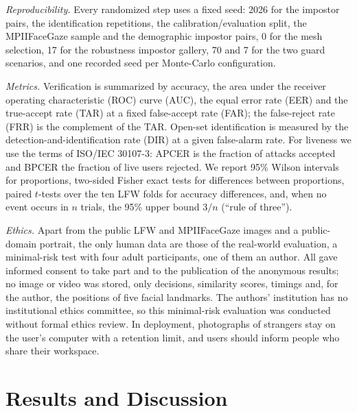\documentclass[journal]{IEEEtran}
\begin{document}
\emph{Reproducibility.} Every randomized step uses a fixed seed: 2026 for the impostor pairs, the identification repetitions, the calibration/evaluation split, the MPIIFaceGaze sample and the demographic impostor pairs, 0 for the mesh selection, 17 for the robustness impostor gallery, 70 and 7 for the two guard scenarios, and one recorded seed per Monte-Carlo configuration.

\emph{Metrics.} Verification is summarized by accuracy, the area under the receiver operating characteristic (ROC) curve (AUC), the equal error rate (EER) and the true-accept rate (TAR) at a fixed false-accept rate (FAR); the false-reject rate (FRR) is the complement of the TAR. Open-set identification is measured by the detection-and-identification rate (DIR) at a given false-alarm rate. For liveness we use the terms of ISO/IEC 30107-3: APCER is the fraction of attacks accepted and BPCER the fraction of live users rejected. We report 95\% Wilson intervals for proportions, two-sided Fisher exact tests for differences between proportions, paired $t$-tests over the ten LFW folds for accuracy differences, and, when no event occurs in $n$ trials, the 95\% upper bound $3/n$ (``rule of three'').

\emph{Ethics.} Apart from the public LFW and MPIIFaceGaze images and a public-domain portrait, the only human data are those of the real-world evaluation, a minimal-risk test with four adult participants, one of them an author. All gave informed consent to take part and to the publication of the anonymous results; no image or video was stored, only decisions, similarity scores, timings and, for the author, the positions of five facial landmarks. The authors' institution has no institutional ethics committee, so this minimal-risk evaluation was conducted without formal ethics review. In deployment, photographs of strangers stay on the user's computer with a retention limit, and users should inform people who share their workspace.

\section{Results and Discussion}\label{sec:results}
\end{document}
